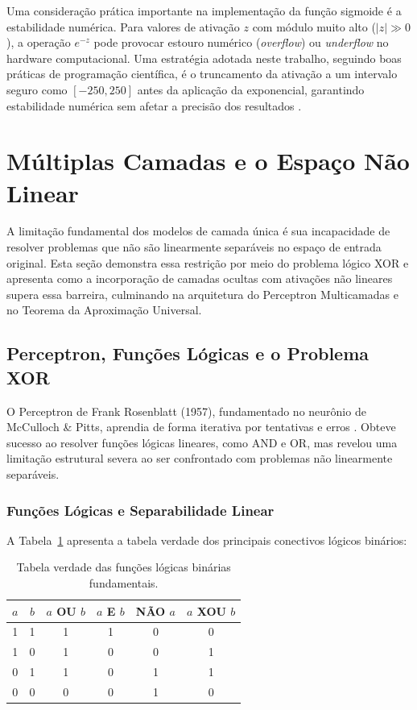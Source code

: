 Uma consideração prática importante na implementação da função sigmoide é a estabilidade numérica. Para valores de ativação $z$ com módulo muito alto ($|z| \gg 0$), a operação $e^{-z}$ pode provocar estouro numérico (\textit{overflow}) ou \textit{underflow} no hardware computacional. Uma estratégia adotada neste trabalho, seguindo boas práticas de programação científica, é o truncamento da ativação a um intervalo seguro como $[-250, 250]$ antes da aplicação da exponencial, garantindo estabilidade numérica sem afetar a precisão dos resultados \cite{dsa2022}.

\section{Múltiplas Camadas e o Espaço Não Linear}

A limitação fundamental dos modelos de camada única é sua incapacidade de resolver problemas que não são linearmente separáveis no espaço de entrada original. Esta seção demonstra essa restrição por meio do problema lógico XOR e apresenta como a incorporação de camadas ocultas com ativações não lineares supera essa barreira, culminando na arquitetura do Perceptron Multicamadas e no Teorema da Aproximação Universal.

\subsection{Perceptron, Funções Lógicas e o Problema XOR}

O Perceptron de Frank Rosenblatt (1957), fundamentado no neurônio de McCulloch \& Pitts, aprendia de forma iterativa por tentativas e erros \cite{abdi1994}. Obteve sucesso ao resolver funções lógicas lineares, como AND e OR, mas revelou uma limitação estrutural severa ao ser confrontado com problemas não linearmente separáveis.

\subsubsection{Funções Lógicas e Separabilidade Linear}

A Tabela~\ref{tab:logicas} apresenta a tabela verdade dos principais conectivos lógicos binários:

\begin{table}[H]
\centering
\caption{Tabela verdade das funções lógicas binárias fundamentais.}
\label{tab:logicas}
\begin{tabular}{cc|cccc}
\hline
$a$ & $b$ & $a$ OU $b$ & $a$ E $b$ & NÃO $a$ & $a$ XOU $b$ \\
\hline
1  & 1  & 1 & 1 & 0 & 0 \\
1  & 0  & 1 & 0 & 0 & 1 \\
0  & 1  & 1 & 0 & 1 & 1 \\
0  & 0  & 0 & 0 & 1 & 0 \\
\hline
\end{tabular}
\end{table}

